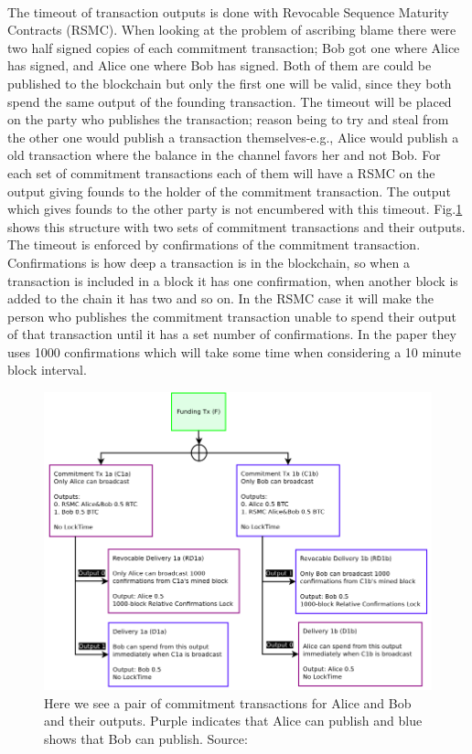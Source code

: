 \documentclass[informationsecurity]{gucmasterproject}
\begin{document}
\paragraph{}
The timeout of transaction outputs is done with Revocable Sequence Maturity Contracts (RSMC). When looking at the problem of ascribing blame there were two half signed copies of each commitment transaction; Bob got one where Alice has signed, and Alice one where Bob has signed. Both of them are could be published to the blockchain but only the first one will be valid, since they both spend the same output of the founding transaction. The timeout will be placed on the party who publishes the transaction; reason being to try and steal from the other one would publish a transaction themselves-e.g., Alice would publish a old transaction where the balance in the channel favors her and not Bob. For each set of commitment transactions each of them will have a RSMC on the output giving founds to the holder of the commitment transaction. The output which gives founds to the other party is not encumbered with this timeout. Fig.\ref{fig:ln_timeout} shows this structure with two sets of commitment transactions and their outputs. The timeout is enforced by confirmations of the commitment transaction. Confirmations is how deep a transaction is in the blockchain, so when a transaction is included in a block it has one confirmation, when another block is added to the chain it has two and so on\cite{antonopoulos2017mastering}. In the RSMC case it will make the person who publishes the commitment transaction unable to spend their output of that transaction until it has a set number of confirmations. In the paper they uses 1000 confirmations which will take some time when considering a 10 minute block interval.

\begin{figure}[h]
    \centering
    \includegraphics[width=12cm]{figs/ln_timeout.png}
    \caption{Here we see a pair of commitment transactions for Alice and Bob and their outputs. Purple indicates that Alice can publish and blue shows that Bob can publish. Source: \cite{poon2015bitcoin}}
    \label{fig:ln_timeout}
\end{figure}
\end{document}
